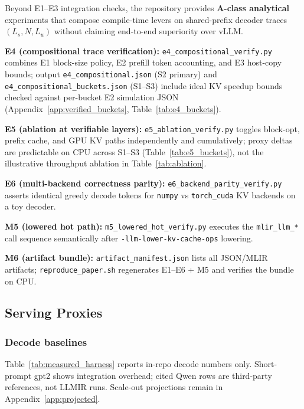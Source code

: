 \documentclass[conference]{IEEEtran}
\begin{document}
Beyond E1--E3 integration checks, the repository provides \textbf{A-class analytical} experiments that compose compile-time levers on shared-prefix decoder traces $(L_s, N, L_u)$ without claiming end-to-end superiority over vLLM.

\textbf{E4 (compositional trace verification):} \texttt{e4\_compositional\_verify.py} combines E1 block-size policy, E2 prefill token accounting, and E3 host-copy bounds; output \texttt{e4\_compositional.json} (S2 primary) and \texttt{e4\_compositional\_buckets.json} (S1--S3) include ideal KV speedup bounds checked against per-bucket E2 simulation JSON (Appendix~\ref{app:verified_buckets}, Table~\ref{tab:e4_buckets}).

\textbf{E5 (ablation at verifiable layers):} \texttt{e5\_ablation\_verify.py} toggles block-opt, prefix cache, and GPU KV paths independently and cumulatively; proxy deltas are predictable on CPU across S1--S3 (Table~\ref{tab:e5_buckets}), not the illustrative throughput ablation in Table~\ref{tab:ablation}.

\textbf{E6 (multi-backend correctness parity):} \texttt{e6\_backend\_parity\_verify.py} asserts identical greedy decode tokens for \texttt{numpy} vs \texttt{torch\_cuda} KV backends on a toy decoder.

\textbf{M5 (lowered hot path):} \texttt{m5\_lowered\_hot\_verify.py} executes the \texttt{mlir\_llm\_*} call sequence semantically after \texttt{-llm-lower-kv-cache-ops} lowering.

\textbf{M6 (artifact bundle):} \texttt{artifact\_manifest.json} lists all JSON/MLIR artifacts; \texttt{reproduce\_paper.sh} regenerates E1--E6 + M5 and verifies the bundle on CPU.

\subsection{Serving Proxies}

\subsubsection{Decode baselines}

Table~\ref{tab:measured_harness} reports in-repo decode numbers only. Short-prompt gpt2 shows integration overhead; cited Qwen rows are third-party references, not LLMIR runs. Scale-out projections remain in Appendix~\ref{app:projected}.
\end{document}
